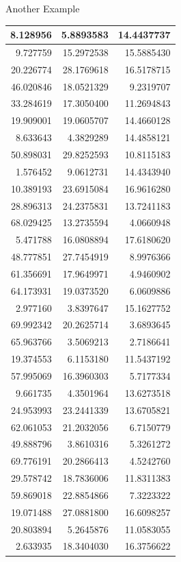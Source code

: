 \documentclass[
  ignorenonframetext,
]{beamer}
\begin{document}
\begin{frame}{Another Example}
\begin{table}
\begin{tabular}[t]{r|r|r}
\hline
8.128956 & 5.8893583 & 14.4437737\\
\hline
9.727759 & 15.2972538 & 15.5885430\\
\hline
20.226774 & 28.1769618 & 16.5178715\\
\hline
46.020846 & 18.0521329 & 9.2319707\\
\hline
33.284619 & 17.3050400 & 11.2694843\\
\hline
19.909001 & 19.0605707 & 14.4660128\\
\hline
8.633643 & 4.3829289 & 14.4858121\\
\hline
50.898031 & 29.8252593 & 10.8115183\\
\hline
1.576452 & 9.0612731 & 14.4343940\\
\hline
10.389193 & 23.6915084 & 16.9616280\\
\hline
28.896313 & 24.2375831 & 13.7241183\\
\hline
68.029425 & 13.2735594 & 4.0660948\\
\hline
5.471788 & 16.0808894 & 17.6180620\\
\hline
48.777851 & 27.7454919 & 8.9976366\\
\hline
61.356691 & 17.9649971 & 4.9460902\\
\hline
64.173931 & 19.0373520 & 6.0609886\\
\hline
2.977160 & 3.8397647 & 15.1627752\\
\hline
69.992342 & 20.2625714 & 3.6893645\\
\hline
65.963766 & 3.5069213 & 2.7186641\\
\hline
19.374553 & 6.1153180 & 11.5437192\\
\hline
57.995069 & 16.3960303 & 5.7177334\\
\hline
9.661735 & 4.3501964 & 13.6273518\\
\hline
24.953993 & 23.2441339 & 13.6705821\\
\hline
62.061053 & 21.2032056 & 6.7150779\\
\hline
49.888796 & 3.8610316 & 5.3261272\\
\hline
69.776191 & 20.2866413 & 4.5242760\\
\hline
29.578742 & 18.7836006 & 11.8311383\\
\hline
59.869018 & 22.8854866 & 7.3223322\\
\hline
19.071488 & 27.0881800 & 16.6098257\\
\hline
20.803894 & 5.2645876 & 11.0583055\\
\hline
2.633935 & 18.3404030 & 16.3756622\\

\end{tabular}
\end{table}
\end{frame}
\end{document}
